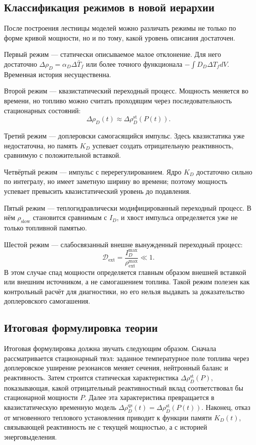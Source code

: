 \documentclass[12pt]{article}
\begin{document}
\subsection{Классификация режимов в новой иерархии}

После построения лестницы моделей можно различать режимы не только по форме кривой мощности, но и по тому, какой уровень описания достаточен.

Первый режим --- статически описываемое малое отклонение. Для него достаточно \(\Delta\rho_D=\alpha_D\Delta\bar T_f\) или более точного функционала \(-\int D_D\Delta T_fdV\). Временная история несущественна.

Второй режим --- квазистатический переходный процесс. Мощность меняется во времени, но топливо можно считать проходящим через последовательность стационарных состояний:
\[
\Delta\rho_D(t)\approx\Delta\rho_D^{\mathrm{st}}(P(t)).
\]

Третий режим --- доплеровски самогасящийся импульс. Здесь квазистатика уже недостаточна, но память \(K_D\) успевает создать отрицательную реактивность, сравнимую с положительной вставкой.

Четвёртый режим --- импульс с перерегулированием. Ядро \(K_D\) достаточно сильно по интегралу, но имеет заметную ширину во времени; поэтому мощность успевает превысить квазистатический уровень до подавления.

Пятый режим --- теплогидравлически модифицированный переходный процесс. В нём \(\rho_{\mathrm{slow}}\) становится сравнимым с \(I_D\), и хвост импульса определяется уже не только топливной памятью.

Шестой режим --- слабосвязанный внешне вынужденный переходный процесс:
\[
\mathcal D_{\mathrm{ext}}
=
\frac{I_D^{\max}}{\rho_{\mathrm{ext}}^{\max}}
\ll1.
\]
В этом случае спад мощности определяется главным образом внешней вставкой или внешним источником, а не самогашением топлива. Такой режим полезен как контрольный расчёт для диагностики, но его нельзя выдавать за доказательство доплеровского самогашения.

\subsection{Итоговая формулировка теории}

Итоговая формулировка должна звучать следующим образом. Сначала рассматривается стационарный твэл: заданное температурное поле топлива через доплеровское уширение резонансов меняет сечения, нейтронный баланс и реактивность. Затем строится статическая характеристика \(\Delta\rho_D^{\mathrm{st}}(P)\), показывающая, какой отрицательный реактивностный вклад соответствовал бы стационарной мощности \(P\). Далее эта характеристика превращается в квазистатическую временную модель \(\Delta\rho_D^{\mathrm{qs}}(t)=\Delta\rho_D^{\mathrm{st}}(P(t))\). Наконец, отказ от мгновенного теплового установления приводит к функции памяти \(K_D(t)\), связывающей реактивность не с текущей мощностью, а с историей энерговыделения.
\end{document}
